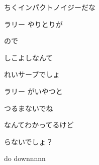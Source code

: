 \documentclass[a4paper,tate,twocolumn,12pt]{ltjtarticle}
\begin{document}
\begin{flushleft}
\begin{minipage}{\linewidth}
ちくインパクトノイジーだな
\end{minipage}

\vspace{2em}

\noindent\begin{minipage}{\linewidth}
ラリー やりとりが

ので

しこよしなんて

れいサーブでしょ

ラリー がいやつと

つるまないでね

なんてわかってるけど

らないでしょ？
\end{minipage}

\vspace{2em}

\noindent\begin{minipage}{\linewidth}
do downnnnn
\end{minipage}

\end{flushleft}
\end{document}
